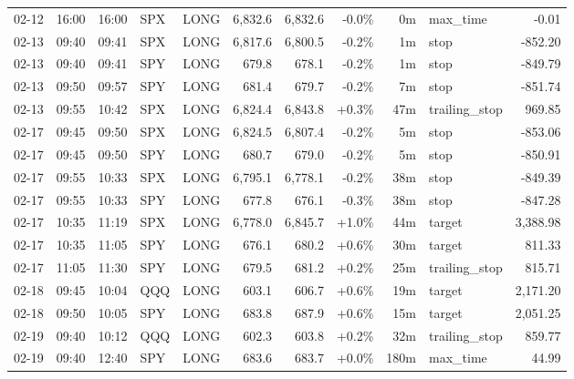 \documentclass[11pt,a4paper,twoside]{article}
\begin{document}
\begin{center}
\begin{longtable}{>{\color{txtmain}}l l l l l r r r r >{\color{txtmain}}l r}
02-12 & 16:00 & 16:00 & SPX & LONG & 6,832.6 & 6,832.6 & \textcolor{lossred}{-0.0\%} & 0m & max\_time & \textcolor{lossred}{-0.01} \\
02-13 & 09:40 & 09:41 & SPX & LONG & 6,817.6 & 6,800.5 & \textcolor{lossred}{-0.2\%} & 1m & stop & \textcolor{lossred}{-852.20} \\
02-13 & 09:40 & 09:41 & SPY & LONG & 679.8 & 678.1 & \textcolor{lossred}{-0.2\%} & 1m & stop & \textcolor{lossred}{-849.79} \\
02-13 & 09:50 & 09:57 & SPY & LONG & 681.4 & 679.7 & \textcolor{lossred}{-0.2\%} & 7m & stop & \textcolor{lossred}{-851.74} \\
02-13 & 09:55 & 10:42 & SPX & LONG & 6,824.4 & 6,843.8 & \textcolor{wingreen}{+0.3\%} & 47m & trailing\_stop & \textcolor{wingreen}{969.85} \\
02-17 & 09:45 & 09:50 & SPX & LONG & 6,824.5 & 6,807.4 & \textcolor{lossred}{-0.2\%} & 5m & stop & \textcolor{lossred}{-853.06} \\
02-17 & 09:45 & 09:50 & SPY & LONG & 680.7 & 679.0 & \textcolor{lossred}{-0.2\%} & 5m & stop & \textcolor{lossred}{-850.91} \\
02-17 & 09:55 & 10:33 & SPX & LONG & 6,795.1 & 6,778.1 & \textcolor{lossred}{-0.2\%} & 38m & stop & \textcolor{lossred}{-849.39} \\
02-17 & 09:55 & 10:33 & SPY & LONG & 677.8 & 676.1 & \textcolor{lossred}{-0.3\%} & 38m & stop & \textcolor{lossred}{-847.28} \\
02-17 & 10:35 & 11:19 & SPX & LONG & 6,778.0 & 6,845.7 & \textcolor{wingreen}{+1.0\%} & 44m & target & \textcolor{wingreen}{3,388.98} \\
02-17 & 10:35 & 11:05 & SPY & LONG & 676.1 & 680.2 & \textcolor{wingreen}{+0.6\%} & 30m & target & \textcolor{wingreen}{811.33} \\
02-17 & 11:05 & 11:30 & SPY & LONG & 679.5 & 681.2 & \textcolor{wingreen}{+0.2\%} & 25m & trailing\_stop & \textcolor{wingreen}{815.71} \\
02-18 & 09:45 & 10:04 & QQQ & LONG & 603.1 & 606.7 & \textcolor{wingreen}{+0.6\%} & 19m & target & \textcolor{wingreen}{2,171.20} \\
02-18 & 09:50 & 10:05 & SPY & LONG & 683.8 & 687.9 & \textcolor{wingreen}{+0.6\%} & 15m & target & \textcolor{wingreen}{2,051.25} \\
02-19 & 09:40 & 10:12 & QQQ & LONG & 602.3 & 603.8 & \textcolor{wingreen}{+0.2\%} & 32m & trailing\_stop & \textcolor{wingreen}{859.77} \\
02-19 & 09:40 & 12:40 & SPY & LONG & 683.6 & 683.7 & \textcolor{wingreen}{+0.0\%} & 180m & max\_time & \textcolor{wingreen}{44.99} \\

\end{longtable}
\end{center}
\end{document}
